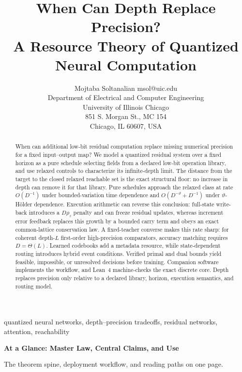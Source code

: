 \documentclass[twoside,11pt]{article}
\title{When Can Depth Replace Precision?\\
A Resource Theory of Quantized Neural Computation}
\author{\name Mojtaba Soltanalian \email msol@uic.edu \\
       \addr Department of Electrical and Computer Engineering\\
       University of Illinois Chicago\\
       851 S. Morgan St., MC 154\\
       Chicago, IL 60607, USA}
\begin{document}
\maketitle

\begin{abstract}
When can additional low-bit residual computation replace missing numerical
precision for a fixed input--output map? We model a quantized residual system
over a fixed horizon as a pure schedule selecting fields from a declared
low-bit operation library, and use relaxed controls to characterize its
infinite-depth limit. The distance from the target to the closed relaxed
reachable set is the exact structural floor: no increase in depth can remove
it for that library. Pure schedules approach the relaxed class at rate
$O(D^{-1})$ under bounded-variation time dependence and
$O(D^{-\vartheta}+D^{-1})$ under $\vartheta$-H\"older dependence. Execution
arithmetic can reverse this conclusion: full-state write-back introduces a
$D\rho_z$ penalty and can freeze residual updates, whereas increment error
feedback replaces this growth by a bounded carry term and obeys an exact
common-lattice conservation law. A fixed-teacher converse makes this rate sharp: for coherent depth-$L$ first-order
high-precision comparators, accuracy matching requires $D=\Theta(L)$. Learned codebooks add a metadata
resource, while state-dependent routing introduces hybrid event conditions.
Verified primal and dual bounds yield feasible, impossible, or unresolved
decisions before training. Companion software implements the workflow, and
Lean~4 machine-checks the exact discrete core. Depth replaces precision only
relative to a declared library, horizon, execution semantics, and routing
model.
\end{abstract}
\vspace{3mm}

\begin{keywords}
quantized neural networks, depth--precision tradeoffs, residual networks,
attention, reachability
\end{keywords}

\clearpage
\thispagestyle{plain}
\begingroup
\setlength{\parindent}{0pt}
\setlength{\parskip}{0pt}
\setlength{\fboxsep}{4.5pt}
\setlength{\fboxrule}{0.7pt}
\setlength{\abovedisplayskip}{2pt}
\setlength{\belowdisplayskip}{2pt}
\footnotesize

\begin{center}
{\Large\bfseries\color{DeepBlue} At a Glance: Master Law, Central Claims, and Use}\par
\vspace{1pt}
{\small The theorem spine, deployment workflow, and reading paths on one page.}
\end{center}
\vspace{3pt}
\end{document}
